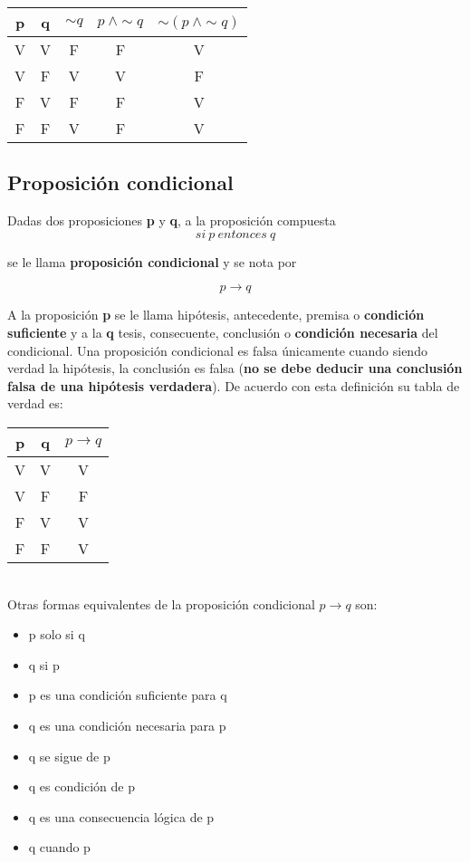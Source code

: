 \documentclass[a4paper,11pt,oneside,titlepage,final]{scrartc}
\begin{document}
\begin{tabular}{|c|c|c|c|c|}
\hline 
p & q & $\sim q$ & $p~\wedge \sim q$ & $\sim (p~\wedge \sim q)$ \\ 
\hline 
V & V & F & F & V \\ 
\hline 
V & F & V & V & F \\ 
\hline 
F & V & F & F & V \\ 
\hline 
F & F & V & F & V \\ 
\hline 
\end{tabular} 

\subsection{Proposición condicional}

Dadas dos proposiciones \textbf{p} y \textbf{q}, a la proposición compuesta 
$$si~p~entonces~q$$

se le llama \textbf{proposición condicional} y se nota por

$$ p \longrightarrow q $$

A la proposición \textbf{p} se le llama hipótesis, antecedente, premisa o \textbf{condición suficiente} y a la \textbf{q} tesis, consecuente, conclusión o \textbf{condición necesaria} del condicional. Una proposición condicional es falsa únicamente cuando siendo verdad la hipótesis, la conclusión es falsa (\textbf{no se debe deducir una conclusión falsa de una hipótesis verdadera}). De acuerdo con esta definición su tabla de verdad es:\\

\begin{tabular}{|c|c|c|}
\hline 
p & q & $p \longrightarrow q$ \\ 
\hline 
V & V & V \\ 
\hline 
V & F & F \\ 
\hline 
F & V & V \\ 
\hline 
F & F & V \\ 
\hline 
\end{tabular} \\

Otras formas equivalentes de la proposición condicional $p \longrightarrow q$ son:
\begin{itemize}
\item p solo si q
\item q si p
\item p es una condición suficiente para q
\item q es una condición necesaria para p
\item q se sigue de p
\item q es condición de p
\item q es una consecuencia lógica de p
\item q cuando p
\end{itemize}
\end{document}
